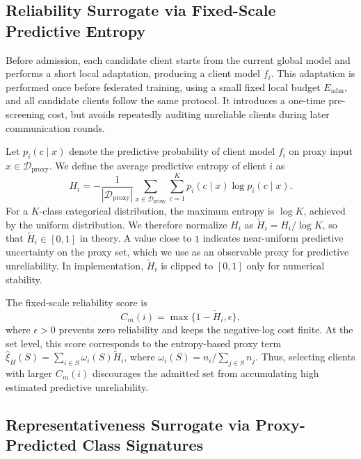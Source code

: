 \documentclass[conference]{IEEEtran}
\theoremstyle{definition}
\theoremstyle{remark}
\begin{document}
\subsection{Reliability Surrogate via Fixed-Scale Predictive Entropy}
\label{subsec:reliability_surrogate}

Before admission, each candidate client starts from the current global model and performs a short local adaptation, producing a client model $f_i$.
This adaptation is performed once before federated training, using a small fixed local budget $E_{\mathrm{adm}}$, and all candidate clients follow the same protocol.
It introduces a one-time pre-screening cost, but avoids repeatedly auditing unreliable clients during later communication rounds.

Let $p_i(c\mid x)$ denote the predictive probability of client model $f_i$ on proxy input $x\in\mathcal D_{\mathrm{proxy}}$.
We define the average predictive entropy of client $i$ as
\begin{equation}
\label{eq:entropy_main}
H_i
=
-\frac{1}{|\mathcal D_{\mathrm{proxy}}|}
\sum_{x\in\mathcal D_{\mathrm{proxy}}}
\sum_{c=1}^{K}
p_i(c\mid x)\log p_i(c\mid x).
\end{equation}
For a $K$-class categorical distribution, the maximum entropy is $\log K$, achieved by the uniform distribution.
We therefore normalize $H_i$ as $\widetilde H_i=H_i/\log K$, so that $\widetilde H_i\in[0,1]$ in theory.
A value close to $1$ indicates near-uniform predictive uncertainty on the proxy set, which we use as an observable proxy for predictive unreliability.
In implementation, $\widetilde H_i$ is clipped to $[0,1]$ only for numerical stability.

The fixed-scale reliability score is
\begin{equation}
\label{eq:quality_score}
C_m(i)
=
\max\{1-\widetilde H_i,\epsilon\},
\end{equation}
where $\epsilon>0$ prevents zero reliability and keeps the negative-log cost finite.
At the set level, this score corresponds to the entropy-based proxy term $\widehat{\xi}_{H}(S)=\sum_{i\in S}\omega_i(S)\widetilde H_i$, where $\omega_i(S)=n_i/\sum_{j\in S}n_j$.
Thus, selecting clients with larger $C_m(i)$ discourages the admitted set from accumulating high estimated predictive unreliability.

\subsection{Representativeness Surrogate via Proxy-Predicted Class Signatures}
\label{subsec:representativeness_surrogate}
\end{document}
